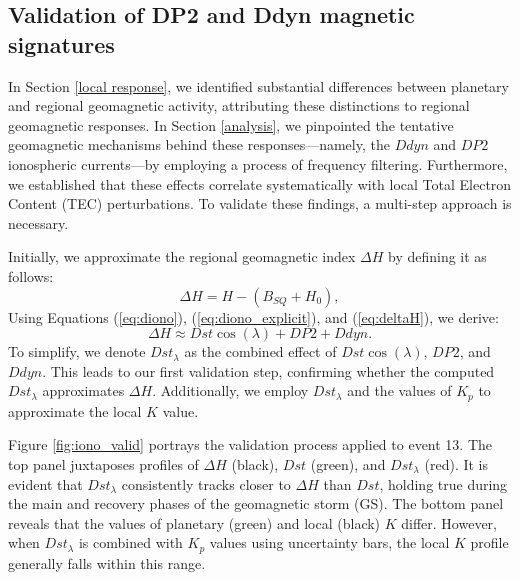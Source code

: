 \documentclass[a4paper,fleqn]{cas-dc}
\begin{document}
\subsection{Validation of DP2 and Ddyn magnetic signatures}
\label{validation}

In Section \ref{local response}, we identified substantial differences between planetary and regional geomagnetic activity, attributing these distinctions to regional geomagnetic responses. In Section \ref{analysis}, we pinpointed the tentative geomagnetic mechanisms behind these responses—namely, the $Ddyn$ and $DP2$ ionospheric currents—by employing a process of frequency filtering. Furthermore, we established that these effects correlate systematically with local Total Electron Content (TEC) perturbations. To validate these findings, a multi-step approach is necessary.

Initially, we approximate the regional geomagnetic index $\Delta H$ by defining it as follows:
\begin{equation}
    \label{eq:deltaH}
    \Delta H = H - (B_{SQ} + H_0),
\end{equation}
Using Equations (\ref{eq:diono}), (\ref{eq:diono_explicit}), and (\ref{eq:deltaH}), we derive:
\begin{equation}
    \label{eq:deltaHandDst}
    \Delta H \approx Dst \cos(\lambda) + DP2 + Ddyn.
\end{equation}
To simplify, we denote $ Dst_\lambda$ as the combined effect of $ Dst\cos(\lambda)$, $DP2$, and $Ddyn$. This leads to our first validation step, confirming whether the computed $ Dst_\lambda$ approximates $\Delta H$. Additionally, we employ $ Dst_\lambda$ and the values of $K_p$ to approximate the local $K$ value.

Figure \ref{fig:iono_valid} portrays the validation process applied to event 13. The top panel juxtaposes profiles of $\Delta H$ (black), $Dst$ (green), and $Dst_\lambda$ (red). It is evident that $Dst_\lambda$ consistently tracks closer to $\Delta H$ than $Dst$, holding true during the main and recovery phases of the geomagnetic storm (GS). The bottom panel reveals that the values of planetary (green) and local (black) $K$ differ. However, when $Dst_\lambda$ is combined with $K_p$ values using uncertainty bars, the local $K$ profile generally falls within this range.
\end{document}
